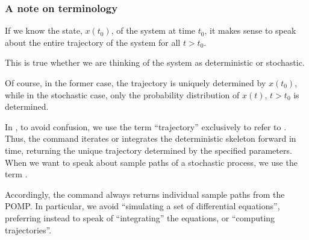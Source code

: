 \documentclass{beamer}\usepackage[]{graphicx}\usepackage[]{color}
\begin{document}
 \begin{frame}[fragile] 

\frametitle{A note on terminology}

\bi

\item If we know the state, $x(t_0)$, of the system at time $t_0$, it makes sense to speak about the entire trajectory of the system for all $t>t_0$.

\item This is true whether we are thinking of the system as deterministic or stochastic.

\item Of course, in the former case, the trajectory is uniquely determined by $x(t_0)$, while in the stochastic case, only the probability distribution of $x(t)$, $t>t_0$ is determined.

\item In , to avoid confusion, we use the term ``trajectory'' exclusively to refer to .
Thus, the  command iterates or integrates the deterministic skeleton forward in time, returning the unique trajectory determined by the specified parameters.
When we want to speak about sample paths of a stochastic process, we use the term .

\item Accordingly, the  command always returns individual sample paths from the POMP.
In particular, we avoid ``simulating a set of differential equations'', preferring instead to speak of ``integrating'' the equations, or ``computing trajectories''.

\ei

\end{frame}    
\end{document}
